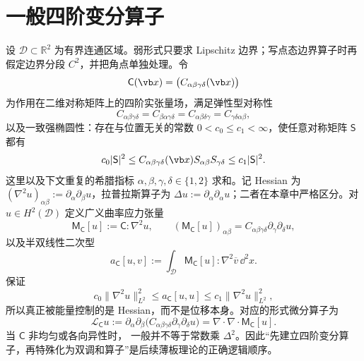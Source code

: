 

\section{一般四阶变分算子}

设 \(\mathcal D\subset\mathbb R^2\) 为有界连通区域。弱形式只要求 Lipschitz 边界；写点态边界算子时再假定边界分段 \(C^2\)，并把角点单独处理。令
\[
 \mathsf C(\vb x)=\bigl(C_{\alpha\beta\gamma\delta}(\vb x)\bigr)
\]
为作用在二维对称矩阵上的四阶实张量场，满足弹性型对称性
\[
 C_{\alpha\beta\gamma\delta}
 =C_{\beta\alpha\gamma\delta}
 =C_{\alpha\beta\delta\gamma}
 =C_{\gamma\delta\alpha\beta},
\]
以及一致强椭圆性：存在与位置无关的常数 \(0<c_0\le c_1<\infty\)，使任意对称矩阵 \(\mathsf S\) 都有
\begin{equation}
 c_0|\mathsf S|^2
 \le C_{\alpha\beta\gamma\delta}(\vb x)S_{\alpha\beta}S_{\gamma\delta}
 \le c_1|\mathsf S|^2.
 \label{eq:phys-cont-fourth-ellipticity}
\end{equation}
这里以及下文重复的希腊指标 \(\alpha,\beta,\gamma,\delta\in\{1,2\}\) 求和。记 Hessian 为 \((\nabla^2u)_{\alpha\beta}:=\partial_\alpha\partial_\beta u\)，拉普拉斯算子为 \(\Delta u:=\partial_\alpha\partial_\alpha u\)；二者在本章中严格区分。对 \(u\in H^2(\mathcal D)\) 定义广义曲率应力张量
\begin{equation}
 \mathsf M_{\mathsf C}[u]
 :=\mathsf C:\nabla^2u,
 \qquad
 (\mathsf M_{\mathsf C}[u])_{\alpha\beta}
 =C_{\alpha\beta\gamma\delta}\partial_\gamma\partial_\delta u,
 \label{eq:phys-cont-general-moment}
\end{equation}
以及半双线性二次型
\begin{equation}
 a_{\mathsf C}[u,v]
 :=\int_\mathcal D
 \mathsf M_{\mathsf C}[u]:\nabla^2\overline v\,\dd^2x.
 \label{eq:phys-cont-general-bending-form}
\end{equation}
 保证
\[
 c_0\|\nabla^2u\|_{L^2}^2
 \le a_{\mathsf C}[u,u]
 \le c_1\|\nabla^2u\|_{L^2}^2,
\]
所以真正被能量控制的是 Hessian，而不是位移本身。对应的形式微分算子为
\begin{equation}
 \mathcal L_{\mathsf C}u
 :=\partial_\alpha\partial_\beta
 \bigl(C_{\alpha\beta\gamma\delta}\partial_\gamma\partial_\delta u\bigr)
 =\nabla\!\cdot\nabla\!\cdot\mathsf M_{\mathsf C}[u].
 \label{eq:phys-cont-general-fourth-operator}
\end{equation}
当 \(\mathsf C\) 非均匀或各向异性时， 一般并不等于常数乘 \(\Delta^2\)。因此“先建立四阶变分算子，再特殊化为双调和算子”是后续薄板理论的正确逻辑顺序。

